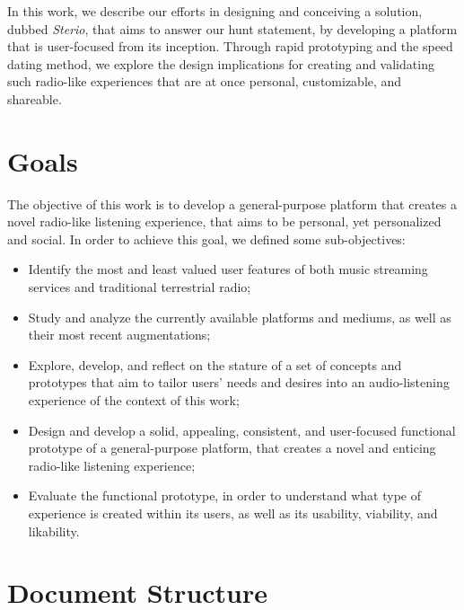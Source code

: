 In this work, we describe our efforts in designing and conceiving a solution, dubbed \textit{Sterio}, that aims to answer our hunt statement, by developing a platform that is user-focused from its inception. Through rapid prototyping and the speed dating method, we explore the design implications for creating and validating such radio-like experiences that are at once personal, customizable, and shareable.

\section{Goals}

The objective of this work is to develop a general-purpose platform that creates a novel radio-like listening experience, that aims to be personal, yet personalized and social. In order to achieve this goal, we defined some sub-objectives:

\begin{itemize}
	\item Identify the most and least valued user features of both music streaming services and traditional terrestrial radio;
	\item Study and analyze the currently available platforms and mediums, as well as their most recent augmentations; 
	\item Explore, develop, and reflect on the stature of a set of concepts and prototypes that aim to tailor users' needs and desires into an audio-listening experience of the context of this work;
	\item Design and develop a solid, appealing, consistent, and user-focused functional prototype of a general-purpose platform, that creates a novel and enticing radio-like listening experience;
	\item Evaluate the functional prototype, in order to understand what type of experience is created within its users, as well as its usability, viability, and likability.
\end{itemize}



\section{Document Structure}

